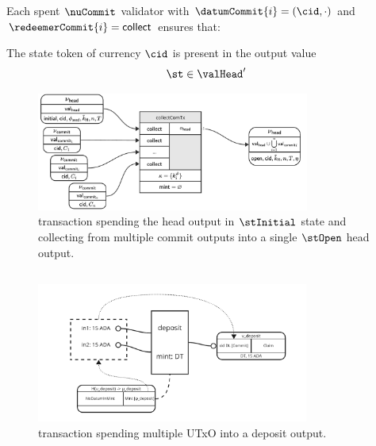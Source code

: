 \noindent Each spent $\nuCommit$ validator with $\datumCommit{i} = (\cid,\cdot)$ and $\redeemerCommit{i} = \mathsf{collect}$ ensures that:
\begin{menumerate}
	\item The state token of currency $\cid$ is present in the output value
	\[
		\st \in \valHead'
	\]
\end{menumerate}

\begin{figure}
	\centering
        \includegraphics[width=0.8\textwidth]{Hydra/Protocol/Figures/collectComTx.pdf}
	\caption{\mtxCCom{} transaction spending the head output in $\stInitial$
		state and collecting from multiple commit outputs into a single
		$\stOpen$ head output.}\label{fig:collectComTx}
\end{figure}

\newpage

\subsection{}\label{sec:deposit-tx}

\begin{figure}
	\centering
	\includegraphics[width=0.8\textwidth]{Hydra/Protocol/Figures/deposit-tx}
	\caption{\mtxDeposit{} transaction spending multiple UTxO into a deposit
	  output.}\label{fig:depositTx}
\end{figure}

\subsection{}\label{sec:recover-tx}

